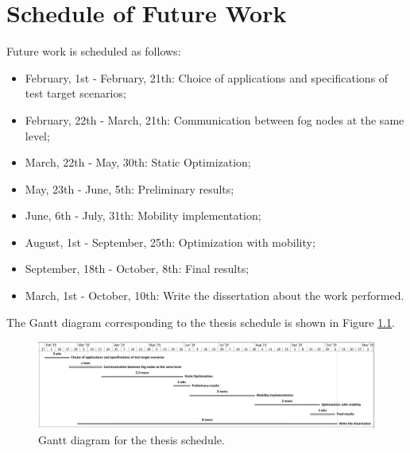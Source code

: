 \chapter{Schedule of Future Work}
\label{sec:Schedule}

Future work is scheduled as follows:
\begin{itemize}[noitemsep]
  \item February, 1st - February, 21th: Choice of applications and specifications of test target scenarios;
  \item February, 22th - March, 21th: Communication between fog nodes at the same level;
  \item March, 22th - May, 30th: Static Optimization;
  \item May, 23th - June, 5th: Preliminary results;
  \item June, 6th - July, 31th: Mobility implementation;
  \item August, 1st - September, 25th: Optimization with mobility;
  \item September, 18th - October, 8th: Final results;
  \item March, 1st - October, 10th: Write the dissertation about the work performed.
\end{itemize}
\noindent\tab The Gantt diagram corresponding to the thesis schedule is shown in Figure \ref{fig:schedule}.
\begin{figure}[h]
	\centering
	\includegraphics[width=\textwidth]{images/schedule/schedule.pdf}
	\caption{Gantt diagram for the thesis schedule.}
	\label{fig:schedule}
\end{figure}